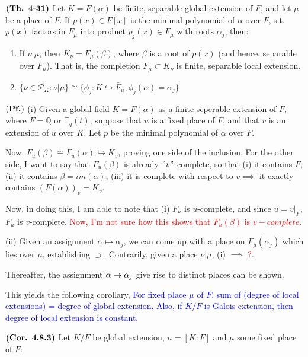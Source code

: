 \documentclass{article}
\begin{document}
$\textbf{(Th. 4-31)}$ Let $K=F(\alpha)$ be finite, separable global extension of $F$, and let $\mu$ be a place of $F$. If $p(x) \in F[x]$ is the minimal polynomial of $\alpha$ over $F$, s.t. $p(x)$ factors in $F_{\mu}$ into product $p_j(x) \in F_{\mu}$ with roots $\alpha_j$, then:

\begin{enumerate}
    \item If $\nu | \mu$, then $K_{\nu} = F_{\mu}(\beta)$, where $\beta$ is a root of $p(x)$ (and hence, separable over $F_{\mu}$). That is, the completion $F_{\mu} \subset K_{\nu}$ is finite, separable local extension.
    \item $\{\nu \in \mathcal{P}_K : \nu | \mu\} \cong \{ \phi_j: K \hookrightarrow \bar{F}_{\mu}, \phi_j(\alpha) = \alpha_j\}$
\end{enumerate}

$(\textbf{Pf.})$ 
(i) Given a global field $K = F(\alpha)$ as a finite seperable extension of $F$, where $F = \mathbb{Q} $ or $\mathbb{F}_q(t)$, suppose that $u$ is a fixed place of $F$, and that $v$ is an extension of $u$ over $K$. Let $p$ be the minimal polynomial of $\alpha$ over $F$.

Now, $F_u(\beta) \cong F_u(\alpha) \hookrightarrow K_v$, proving one side of the inclusion. For the other side, I want to say that $F_u(\beta)$ is already $"v"$-complete, so that (i) it contains $F$, (ii) it contains $\beta = im(\alpha)$, (iii) it is complete with respect to $v \implies$ it exactly contains $(F(\alpha))_v = K_v$. 

Now, in doing this, I am able to note that (i) $F_u$ is $u$-complete, and since $u = v|_F$, $F_u$ is $v$-complete. \textcolor{red}{Now, I'm not sure how this shows that $F_u(\beta)$ is $v-complete$.}

(ii) Given an assignment $\alpha \mapsto \alpha_j$, we can come up with a place on $F_\mu(\alpha_j)$ which lies over $\mu$, establishing $\supset$. Contrarily, given a place $\nu|\mu$, (i) $\implies$ \textcolor{red}{?}.

Thereafter, the assignment $\alpha \rightarrow \alpha_j$ give rise to distinct places can be shown.

This yields the following corollary, \textcolor{blue}{For fixed place $\mu$ of $F$, sum of (degree of local extensions) = degree of global extension. Also, if $K/F$ is Galois extension, then degree of local extension is constant.}

$\textbf{(Cor. 4.8.3)}$ Let $K/F$ be global extension, $n = [K:F]$ and $\mu$ some fixed place of $F$:
\end{document}
